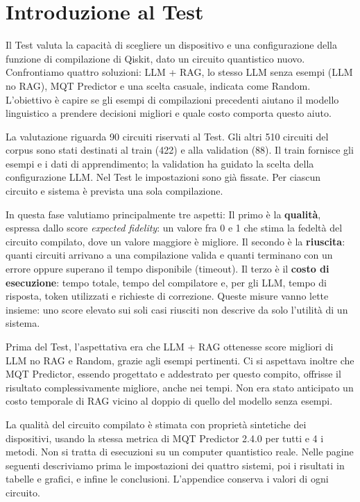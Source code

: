 \providecommand{\TestReportPath}{../}
\section{Introduzione al Test}
Il Test valuta la capacità di scegliere un dispositivo e una configurazione della
funzione di compilazione di Qiskit, dato un circuito quantistico nuovo. 
Confrontiamo quattro soluzioni: LLM + RAG, lo stesso LLM senza
esempi (LLM no RAG), MQT Predictor e una scelta casuale, indicata come Random.
L'obiettivo è capire se gli esempi di compilazioni precedenti aiutano il modello
linguistico a prendere decisioni migliori e quale costo comporta questo aiuto.

La valutazione riguarda 90 circuiti riservati al Test. Gli altri 510 circuiti
del corpus sono stati destinati al train (422) e alla validation (88).
Il train fornisce gli esempi e i dati di apprendimento; la validation ha guidato
la scelta della configurazione LLM. Nel Test le impostazioni sono già fissate.
Per ciascun circuito e sistema è prevista una sola compilazione.

In questa fase valutiamo principalmente tre aspetti:
Il primo è la \textbf{qualità}, espressa
dallo score \emph{expected fidelity}: un valore fra 0 e 1 che stima la fedeltà
del circuito compilato, dove un valore maggiore è migliore. Il secondo è la
\textbf{riuscita}: quanti circuiti arrivano a una compilazione valida e quanti
terminano con un errore oppure superano il tempo disponibile (timeout). Il terzo è il
\textbf{costo di esecuzione}: tempo totale, tempo del compilatore e, per gli
LLM, tempo di risposta, token utilizzati e richieste di correzione.
Queste misure vanno lette insieme: uno score elevato sui soli casi riusciti
non descrive da solo l'utilità di un sistema.

Prima del Test, l'aspettativa era che LLM + RAG ottenesse score
migliori di LLM no RAG e Random, grazie agli esempi pertinenti. Ci si aspettava
inoltre che MQT Predictor, essendo progettato e addestrato per questo compito,
offrisse il risultato complessivamente migliore, anche nei tempi.
Non era stato anticipato un costo temporale di RAG vicino al doppio di quello
del modello senza esempi.

La qualità del circuito compilato è stimata con proprietà sintetiche dei dispositivi, usando la stessa
metrica di MQT Predictor 2.4.0 per tutti e 4 i metodi. Non si tratta di esecuzioni
su un computer quantistico reale. Nelle pagine seguenti descriviamo prima
le impostazioni dei quattro sistemi, poi i risultati in tabelle e grafici,
e infine le conclusioni. L'appendice conserva i valori di ogni circuito.

